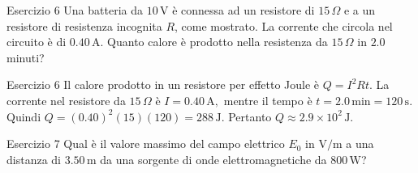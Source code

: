 \documentclass[a4paper]{article}
\begin{document}
\begin{snippetexercise}{Esercizio 6}
    Una batteria da \(10\,\mathrm{V}\) è connessa ad un resistore di
    \(15\,\Omega\) e a un resistore di resistenza incognita \(R\), come mostrato.
    La corrente che circola nel circuito è di \(0.40\,\mathrm{A}\). Quanto calore
    è prodotto nella resistenza da \(15\,\Omega\) in \(2.0\) minuti?
    \begin{center}
    \end{center}
\end{snippetexercise}
\begin{snippetsolution}{Esercizio 6}
    Il calore prodotto in un resistore per effetto Joule è
    \(Q = I^2 R t.\)
    La corrente nel resistore da \(15\,\Omega\) è
    \(I = 0.40\,\mathrm{A},\)
    mentre il tempo è
    \(t = 2.0\,\mathrm{min} = 120\,\mathrm{s}.\)
    Quindi
    \(Q = (0.40)^2(15)(120) = 288\,\mathrm{J}.\)
    Pertanto
    \(\boxed{Q \approx 2.9 \times 10^2\,\mathrm{J}}.\)
\end{snippetsolution}
\begin{snippetexercise}{Esercizio 7}
    Qual è il valore massimo del campo elettrico \(E_0\) in \(\mathrm{V/m}\)
    a una distanza di \(3.50\,\mathrm{m}\) da una sorgente di onde
    elettromagnetiche da \(800\,\mathrm{W}\)?
\end{snippetexercise}
\end{document}
